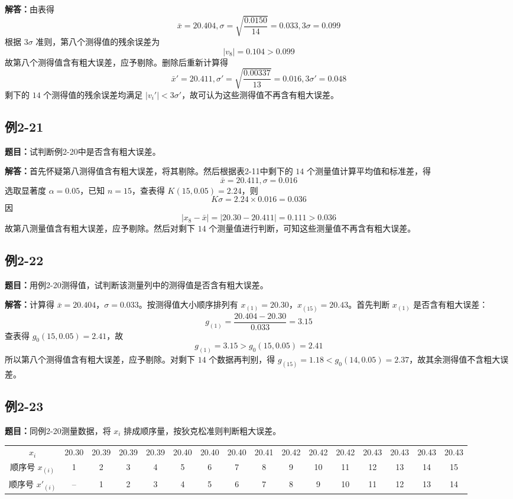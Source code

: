 \documentclass[UTF8,zihao=-4]{ctexart}
\newcommand{\problem}[1]{\subsection*{#1}}
\newcommand{\timu}{\noindent\textbf{题目：}}
\newcommand{\jieda}{\noindent\textbf{解答：}}
\begin{document}
\jieda 由表得
\begin{equation*}
    \bar{x}=20.404,	\sigma=\sqrt{\frac{0.0150}{14}}=0.033,	3\sigma=0.099
\end{equation*}
根据 $3\sigma$ 准则，第八个测得值的残余误差为
\begin{equation*}
    |v_8|=0.104>0.099
\end{equation*}
故第八个测得值含有粗大误差，应予剔除。删除后重新计算得
\begin{equation*}
    \bar{x}'=20.411,	\sigma'=\sqrt{\frac{0.00337}{13}}=0.016,	3\sigma'=0.048
\end{equation*}
剩下的 $14$ 个测得值的残余误差均满足 $|v_i'|<3\sigma'$，故可认为这些测得值不再含有粗大误差。

\problem{例2-21}
\timu 试判断例2-20中是否含有粗大误差。

\jieda 首先怀疑第八测得值含有粗大误差，将其剔除。然后根据表2-11中剩下的 $14$ 个测量值计算平均值和标准差，得
\begin{equation*}
    \bar{x}=20.411,	\sigma=0.016
\end{equation*}
选取显著度 $\alpha=0.05$，已知 $n=15$，查表得 $K(15,0.05)=2.24$，则
\begin{equation*}
    K\sigma=2.24\times0.016=0.036
\end{equation*}
因
\begin{equation*}
    |x_8-\bar{x}|=|20.30-20.411|=0.111>0.036
\end{equation*}
故第八测量值含有粗大误差，应予剔除。然后对剩下 $14$ 个测量值进行判断，可知这些测量值不再含有粗大误差。

\problem{例2-22}
\timu 用例2-20测得值，试判断该测量列中的测得值是否含有粗大误差。

\jieda 计算得 $\bar{x}=20.404$，$\sigma=0.033$。按测得值大小顺序排列有 $x_{(1)}=20.30$，$x_{(15)}=20.43$。首先判断 $x_{(1)}$ 是否含有粗大误差：
\begin{equation*}
    g_{(1)}=\frac{20.404-20.30}{0.033}=3.15
\end{equation*}
查表得 $g_0(15,0.05)=2.41$，故
\begin{equation*}
    g_{(1)}=3.15>g_0(15,0.05)=2.41
\end{equation*}
所以第八个测得值含有粗大误差，应予剔除。对剩下 $14$ 个数据再判别，得 $g_{(15)}=1.18<g_0(14,0.05)=2.37$，故其余测得值不含粗大误差。

\newpage

\problem{例2-23}
\timu 同例2-20测量数据，将 $x_i$ 排成顺序量，按狄克松准则判断粗大误差。

\begin{center}
\scriptsize
\setlength{\tabcolsep}{5pt}
\begin{tabular}{c|ccccccccccccccc}
\toprule
$x_i$ & 20.30 & 20.39 & 20.39 & 20.39 & 20.40 & 20.40 & 20.40 & 20.41 & 20.42 & 20.42 & 20.42 & 20.43 & 20.43 & 20.43 & 20.43\\
顺序号 $x_{(i)}$ & 1 & 2 & 3 & 4 & 5 & 6 & 7 & 8 & 9 & 10 & 11 & 12 & 13 & 14 & 15\\
顺序号 $x'_{(i)}$ & -- & 1 & 2 & 3 & 4 & 5 & 6 & 7 & 8 & 9 & 10 & 11 & 12 & 13 & 14\\
\bottomrule
\end{tabular}
\end{center}
\end{document}
